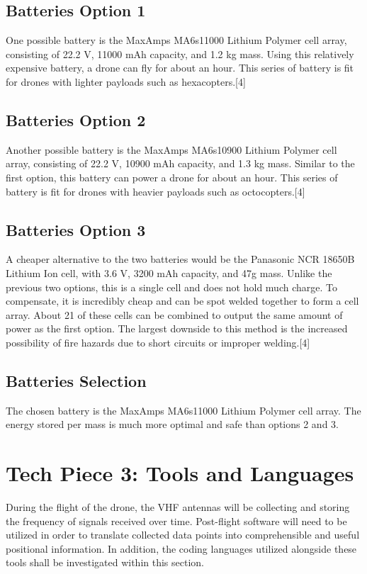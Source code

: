 \documentclass[onecolumn, draftclsnofoot,10pt, compsoc]{IEEEtran}
\begin{document}
\subsection{Batteries Option 1}
One possible battery is the MaxAmps MA6s11000 Lithium Polymer cell array, consisting of 22.2 V, 11000 mAh capacity, and 1.2 kg mass. Using this relatively expensive battery, a drone can fly for about an hour. This series of battery is fit for drones with lighter payloads such as hexacopters.[4]
\subsection{Batteries Option 2}
Another possible battery is the MaxAmps MA6s10900 Lithium Polymer cell array, consisting of 22.2 V, 10900 mAh capacity, and 1.3 kg mass. Similar to the first option, this battery can power a drone for about an hour. This series of battery is fit for drones with heavier payloads such as octocopters.[4]
\subsection{Batteries Option 3}
A cheaper alternative to the two batteries would be the Panasonic NCR 18650B Lithium Ion cell, with 3.6 V, 3200 mAh capacity, and 47g mass. Unlike the previous two options, this is a single cell and does not hold much charge. To compensate, it is incredibly cheap and can be spot welded together to form a cell array. About 21 of these cells can be combined to output the same amount of power as the first option. The largest downside to this method is the increased possibility of fire hazards due to short circuits or improper welding.[4]
\subsection {Batteries Selection}
The chosen battery is the MaxAmps MA6s11000 Lithium Polymer cell array. The energy stored per mass is much more optimal and safe than options 2 and 3.


\section{Tech Piece 3: Tools and Languages}
During the flight of the drone, the VHF antennas will be collecting and storing the frequency of signals received over time. Post-flight software will need to be utilized in order to translate collected data points into comprehensible and useful positional information. In addition, the coding languages utilized alongside these tools shall be investigated within this section.
\end{document}
